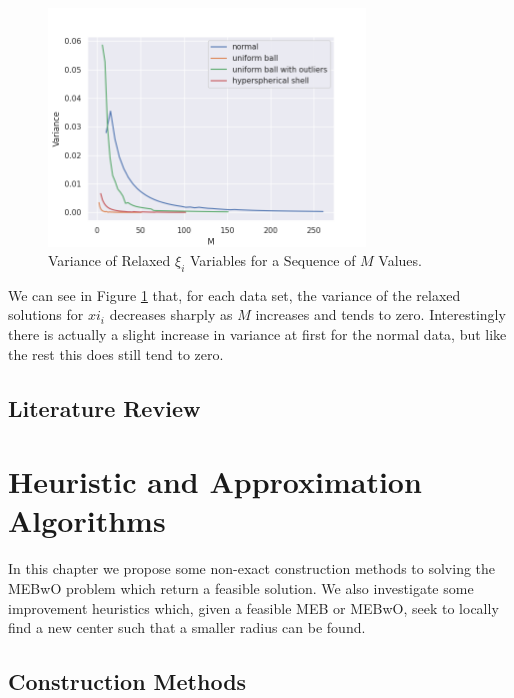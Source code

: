 \documentclass[11pt,twoside]{report}
\theoremstyle{definition}
\numberwithin{theorem}{section}
\numberwithin{definition}{section}
\numberwithin{lemma}{section}
\numberwithin{proposition}{section}
\numberwithin{equation}{section}
\numberwithin{figure}{section}
\begin{document}
\begin{figure}
    \centering
    \includegraphics[width=0.75\textwidth]{xi_analysis.png}
    \caption{Variance of Relaxed $\xi_i$ Variables for a Sequence of $M$ Values.}
    \label{fig:xi analysis}
\end{figure}

We can see in Figure \ref{fig:xi analysis} that, for each data set, the variance of the relaxed solutions for $xi_i$ decreases sharply as $M$ increases and tends to zero. Interestingly there is actually a slight increase in variance at first for the normal data, but like the rest this does still tend to zero.

\section{Literature Review}\label{lit review}


\chapter{Heuristic and Approximation Algorithms}\label{algorithms}

In this chapter we propose some non-exact construction methods to solving the MEBwO problem which return a feasible solution. We also investigate some improvement heuristics which, given a feasible MEB or MEBwO, seek to locally find a new center such that a smaller radius can be found.

\section{Construction Methods}
\end{document}
